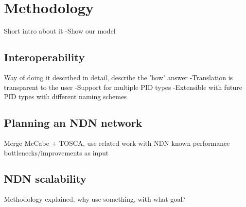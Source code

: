 \section{Methodology}
Short intro about it
-Show our model

\subsection{Interoperability}
Way of doing it described in detail, describe the 'how' answer
-Translation is transparent to the user
-Support for multiple PID types
-Extensible with future PID types with different naming schemes

\subsection{Planning an NDN network}
\label{method-planning}
Merge McCabe + TOSCA, use related work with NDN known performance bottlenecks/improvements as input

\subsection{NDN scalability}
Methodology explained, why use something, with what goal?